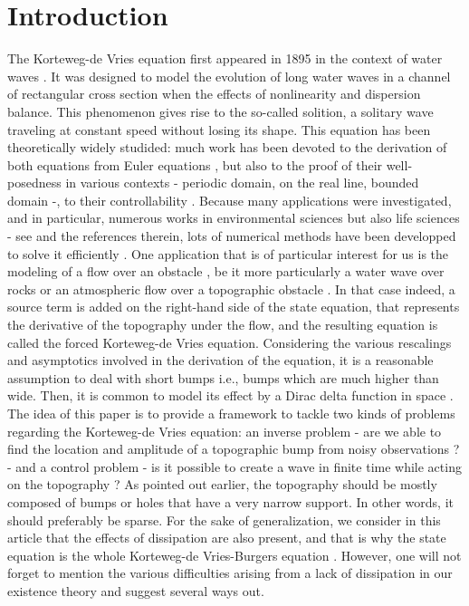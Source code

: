 
\section{Introduction}

The Korteweg-de Vries equation first appeared in 1895 in the context of water waves \cite{korteweg1895xli}. It was designed to model the evolution of long water waves in a channel of rectangular cross section when the effects of nonlinearity and dispersion balance. This phenomenon gives rise to the so-called solition, a solitary wave traveling at constant speed without losing its shape. This equation has been theoretically widely studided: much work has been devoted to the derivation of both equations from Euler equations \cite{shen1992forced,constantin2008,su2003korteweg}, but also to the proof of their well-posedness in various contexts \cite{miura1976korteweg,kenig1993,bourgain1997periodic} - periodic domain, on the real line, bounded domain -, to their controllability \cite{rosier1997exact,glass2008some,coron2003exact,chapouly2009global}. 
Because many applications were investigated, and in particular, numerous works in environmental sciences but also life sciences - see \cite{dauxois2006physics,whitham2011linear,Crepeau2007594,yomosa1987} and the references therein, lots of numerical methods have been developped to solve it efficiently \cite{trefethen2000spectral,shen2003new,ma2000legendre}. One application that is of particular interest for us is the modeling of a flow over an obstacle \cite{milewski2004forced,shen1992forced,shen1996accuracy}, be it more particularly a water wave over rocks or an atmospheric flow over a topographic obstacle \cite{baines1997topographic}. In that case indeed, a source term is added on the right-hand side of the state equation, that represents the derivative of the topography under the flow, and the resulting equation is called the forced Korteweg-de Vries equation. Considering the various rescalings and asymptotics involved in the derivation of the \KdV equation, it is a reasonable assumption to deal with short bumps i.e., bumps which are much higher than wide. Then, it is common to model its effect by a Dirac delta function in space \cite{shen1996accuracy, shen2000bumpdirac}. The idea of this paper is to provide a framework to tackle two kinds of problems regarding the Korteweg-de Vries equation: an inverse problem - are we able to find the location and amplitude of a topographic bump from noisy observations ? -  and a control problem - is it possible to create a wave in finite time while acting on the topography ? As pointed out earlier, the topography should be mostly composed of bumps or holes that have a very narrow support. In other words, it should preferably be sparse. For the sake of generalization, we consider in this article that the effects of dissipation are also present, and that is why the state equation is the whole Korteweg-de Vries-Burgers equation \cite{su2003korteweg}. However, one will not forget to mention the various difficulties arising from a lack of dissipation in our existence theory and suggest several ways out.

